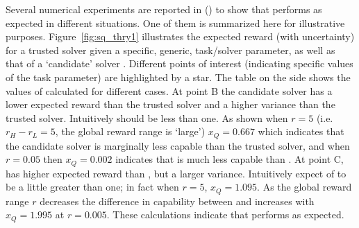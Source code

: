 Several numerical experiments are reported in \cite{Israelsen2018-qz} () to show that \xQ{} performs as expected in different situations. One of them is summarized here for illustrative purposes. Figure~\ref{fig:sq_thry1} illustrates the expected reward (with uncertainty) for a trusted solver \solvestar{} given a specific, generic, task/solver parameter, as well as that of a `candidate' solver \solve. Different points of interest (indicating specific values of the task parameter) are highlighted by a star. The table on the side shows the values of \xQ{} calculated for different cases. At point B the candidate solver has a lower expected reward than the trusted solver and a higher variance than the trusted solver. Intuitively \xQ{} should be less than one. As shown when $r=5$ (i.e. $r_H-r_L=5$, the global reward range is `large') $x_Q=0.667$ which indicates that the candidate solver is marginally less capable than the trusted solver, and when $r=0.05$ then $x_Q=0.002$ indicates that \solve{} is much less capable than \solvestar. At point C, \solve{} has higher expected reward than \solvestar, but a larger variance. Intuitively expect \xQ{} of \solve{} to be a little greater than one; in fact when $r=5$, $x_Q=1.095$. As the global reward range $r$ decreases the difference in capability between \solve{} and \solvestar{} increases with $x_Q=1.995$ at $r=0.005$. These calculations indicate that \xQ{} performs as expected.
